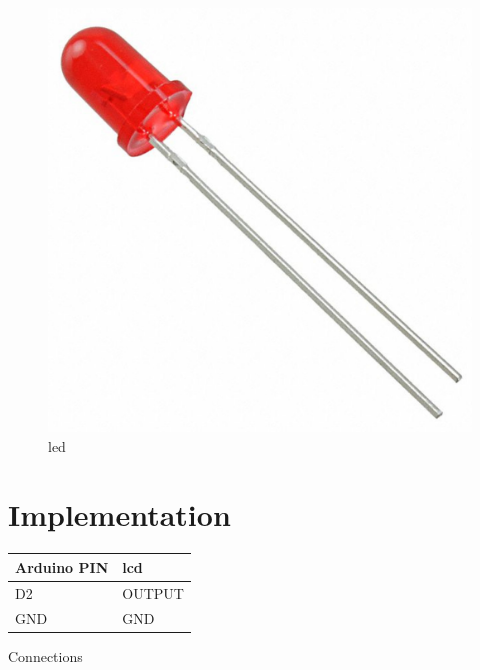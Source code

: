 \documentclass[journal,12pt,twocolumn]{IEEEtran}
\begin{document}
 \begin{figure}
\centering
\includegraphics[width=0.7\columnwidth]{figs/led1.jpg}
\caption{led}
\label{fig:led1}
\end{figure}
   
\section{Implementation}
  \begin{tabularx}{0.46\textwidth} { 
  | >{\centering\arraybackslash}X 
  | >{\centering\arraybackslash}X  | }


\hline
\textbf{Arduino PIN} & \textbf{lcd } \\ 
\hline
D2 & OUTPUT \\
\hline
GND & GND \\
\hline
\end{tabularx}

\begin{center}
    Connections
\end{center}
\end{document}
